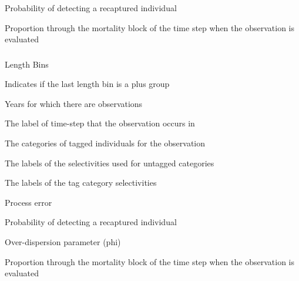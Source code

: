  {Probability of detecting a recaptured individual}

 {Proportion through the mortality block of the time step when the observation is evaluated}

\subsubsection[Tag Recapture By Length]{}

 {Length Bins}

 {Indicates if the last length bin is a plus group}

 {Years for which there are observations}

 {The label of time-step that the observation occurs in}

 {The categories of tagged individuals for the observation}

 {The labels of the selectivities used for untagged categories}

 {The labels of the tag category selectivities}

 {Process error}

 {Probability of detecting a recaptured individual}

 {Over-dispersion parameter (phi)}

 {Proportion through the mortality block of the time step when the observation is evaluated}

